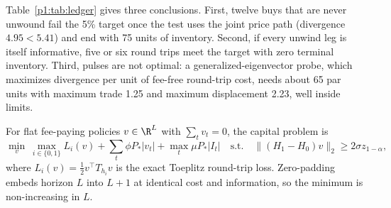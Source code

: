 Table~\ref{p1:tab:ledger} gives three conclusions. First, twelve buys that are never unwound fail the 5\% target once the test uses the joint price path (divergence $4.95<5.41$) and end with 75 units of inventory. Second, if every unwind leg is itself informative, five or six round trips meet the target with zero terminal inventory. Third, pulses are not optimal: a generalized-eigenvector probe, which maximizes divergence per unit of fee-free round-trip cost, needs about 65 par units with maximum trade 1.25 and maximum displacement 2.23, well inside limits.

For flat fee-paying policies $v\in\R^L$ with $\sum_tv_t=0$, the capital problem is
\begin{equation}\label{p1:eq:capprob}
\min_v\ \max_{i\in\{0,1\}}L_i(v)+\sum_t\phi P_*|v_t|+\max_t\mu P_*|I_t|\quad\text{s.t.}\quad\|(H_1-H_0)v\|_2\ge2\sigma z_{1-\alpha},
\end{equation}
where $L_i(v)=\tfrac12v^\top T_{h_i}v$ is the exact Toeplitz round-trip loss. Zero-padding embeds horizon $L$ into $L+1$ at identical cost and information, so the minimum is non-increasing in $L$.

